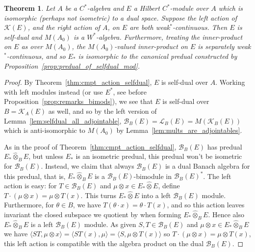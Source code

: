 \documentclass[a4paper,11pt]{article}
\theoremstyle{plain}
\newtheorem{theorem}[proposition]{Theorem}
\theoremstyle{remark}
\newcommand{\mc}[1]{\mathcal{#1}}
\newcommand{\ip}[2]{{\langle {#1} , {#2} \rangle}}
\newcommand{\lin}{\operatorname{lin}}
\newcommand{\proten}{\widehat\otimes}
\begin{document}
\begin{theorem}
Let $A$ be a $C^*$-algebra and $E$ a Hilbert $C^*$-module over $A$ which is isomorphic (perhaps not isometric) to a dual space.  Suppose the left action of $\mc K(E)$, and the right action of $A$, on $E$ are both weak$^*$-continuous.  Then $E$ is self-dual and $M(A_0)$ is a $W^*$-algebra.  Furthermore, treating the inner-product on $E$ as over $M(A_0)$, the $M(A_0)$-valued inner-product on $E$ is separately weak$^*$-continuous, and so $E_*$ is isomorphic to the canonical predual constructed by Proposition~\ref{prop:predual_of_selfdual_mod}.
\end{theorem}
\begin{proof}
By Theorem~\ref{thm:cmpt_action_selfdual}, $E$ is self-dual over $A$.  Working with left modules instead (or use $E^*$, see before Proposition~\ref{prop:remarks_bimods}), we see that $E$ is self-dual over $B = \mc K_A(E)$ as well, and so by the left version of Lemma~\ref{lem:selfdual_all_adjointable}, $\mc B_B(E) = \mc L_B(E) = M(\mc K_B(E))$ which is anti-isomorphic to $M(A_0)$ by Lemma~\ref{lem:mults_are_adjointables}.

As in the proof of Theorem~\ref{thm:cmpt_action_selfdual}, $\mc B_B(E)$ has predual $E_* \proten_B E$, but unless $E_*$ is an isometric predual, this predual won't be isometric for $\mc B_B(E)$.  Instead, we claim that always $\mc B_B(E)$ is a dual Banach algebra for this predual, that is, $E_* \proten_B E$ is a $\mc B_B(E)$-bimodule in $\mc B_B(E)^*$.  The left action is easy: for $T\in\mc B_B(E)$ and $\mu\otimes x \in E_* \proten E$, define $T\cdot (\mu\otimes x) = \mu\otimes T(x)$.  This turns $E_* \proten E$ into a left $\mc B_B(E)$ module.  Furthermore, for $\theta\in B$, we have $T(\theta\cdot x) = \theta \cdot T(x)$, and so this action leaves invariant the closed subspace we quotient by when forming $E_* \proten_B E$.  Hence also $E_* \proten_B E$ is a left $\mc B_B(E)$ module.  As given 
$S, T \in\mc B_B(E)$ and $\mu\otimes x \in E_* \proten_B E$ we have $\ip{ST}{\mu\otimes x} = \ip{ST(x)}{\mu} = \ip{S}{\mu\otimes T(x)}$ so $T\cdot (\mu\otimes x) = \mu\otimes T(x)$, this left action is compatible with the algebra product on the dual $\mc B_B(E)$.



\end{proof}
\end{document}

